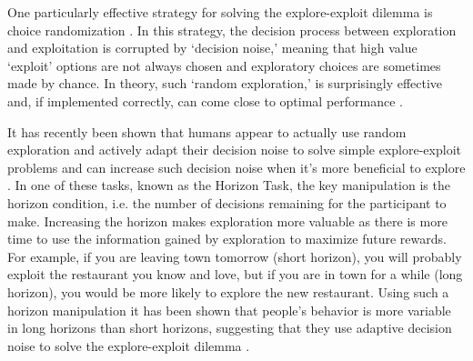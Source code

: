 \documentclass[12pt]{article}
\begin{document}
	One particularly effective strategy for solving the explore-exploit dilemma is choice randomization \citep{eethompson33, eewatkins89, eebridle90}. In this strategy, the decision process between exploration and exploitation is corrupted by `decision noise,' meaning that high value `exploit' options are not always chosen and exploratory choices are sometimes made by chance. In theory, such `random exploration,' is surprisingly effective and, if implemented correctly, can come close to optimal performance \citep{eethompson33, eebridle90, eeAgrawal11, eeChapelle11}.
	

	It has recently been shown that humans appear to actually use random exploration and actively adapt their decision noise to solve simple explore-exploit problems and can increase such decision noise when it's more beneficial to explore \citep{Gershman2018, wilson2014}. In one of these tasks, known as the Horizon Task, the key manipulation is the horizon condition, i.e. the number of decisions remaining for the participant to make. Increasing the horizon makes exploration more valuable as there is more time to use the information gained by exploration to maximize future rewards. For example, if you are leaving town tomorrow (short horizon), you will probably exploit the restaurant you know and love, but if you are in town for a while (long horizon), you would be more likely to explore the new restaurant. Using such a horizon manipulation it has been shown that people's behavior is more variable in long horizons than short horizons, suggesting that they use adaptive decision noise to solve the explore-exploit dilemma \citep{wilson2014}. 
	
\end{document}
